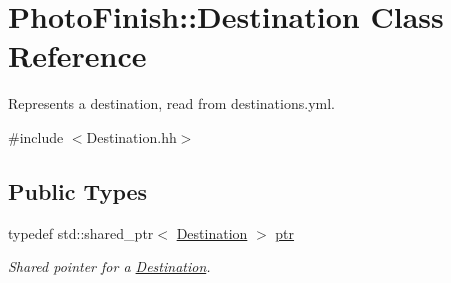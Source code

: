 \hypertarget{class_photo_finish_1_1_destination}{}\section{Photo\+Finish\+:\+:Destination Class Reference}
\label{class_photo_finish_1_1_destination}


Represents a destination, read from destinations.\+yml.  




{\ttfamily \#include $<$Destination.\+hh$>$}

\subsection*{Public Types}
\begin{DoxyCompactItemize}
\item 
typedef std\+::shared\+\_\+ptr$<$ \hyperlink{class_photo_finish_1_1_destination}{Destination} $>$ \hyperlink{class_photo_finish_1_1_destination_a0d282a905cd81c3f0e6d7233c9bc7774}{ptr}
\begin{DoxyCompactList}\small\item\em Shared pointer for a \hyperlink{class_photo_finish_1_1_destination}{Destination}. \end{DoxyCompactList}\end{DoxyCompactItemize}
